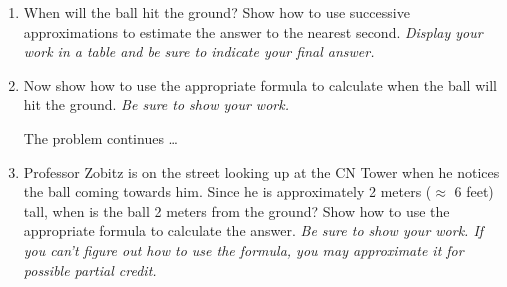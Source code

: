 \documentclass[11pt]{article}
\begin{document}
\begin{enumerate}
\begin{enumerate}
\item When will the ball hit the ground?  Show how to use successive approximations to estimate the answer to the nearest second.  \emph{Display your work in a table and be sure to indicate your final answer.}
\vfill
\item Now show how to use the appropriate formula to calculate when the ball will hit the ground.  \emph{Be sure to show your work.}
\vfill
\vfill
\vfill

\newpage

\hspace{-.5in}  The problem continues \dots

\item Professor Zobitz is on the street looking up at the CN Tower when he notices the ball coming towards him.  Since he is approximately 2 meters ($\approx$ 6 feet) tall, when is the ball 2 meters from the ground?  Show how to use the appropriate formula to calculate the answer.  \emph{Be sure to show your work.  If you can't figure out how to use the formula, you may approximate it for possible partial credit.}
\vfill
\vfill
\end{enumerate}







\end{enumerate}
\end{document}
